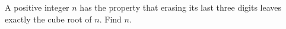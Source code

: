 A positive integer $n$ has the property that erasing its last three digits leaves exactly the cube root of $n$. Find $n$.
